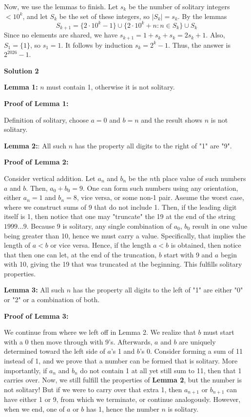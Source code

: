 \begin{enumerate}
 
Now, we use the lemmas to finish. Let $s_k$ be the number of solitary integers $< 10^k$, and let $S_k$ be the set of these integers, so $|S_k|=s_k$. By the lemmas 
 \[S_{k+1} = \{2\cdot 10^k-1\} \cup \{2\cdot 10^k+n : n\in S_k \}\cup S_k\] Since no elements are shared, we have $s_{k+1} = 1 + s_k+s_k=2s_k+1$. Also, $S_1 = \{1\}$, so $s_1 = 1$. It follows by induction $s_k = 2^k-1$. Thus, the answer is $\boxed{2^{2026}-1}$.

 



\textbf{Solution 2}

\textbf{Lemma 1:} $n$ must contain 1, otherwise it is not solitary.

 \textbf{Proof of Lemma 1:}

 Definition of solitary, choose $a = 0$ and $b = n$ and the result shows $n$ is not solitary.

 \textbf{Lemma 2:}: All such $n$ has the property all digits to the right of "1" are "9".

 \textbf{Proof of Lemma 2:}

 Consider vertical addition. Let $a_n$ and $b_n$ be the $n$th place value of such numbers $a$ and $b$. Then, $a_0 + b_0 = 9$. One can form such numbers using any orientation, either $a_n = 1$ and $b_n = 8$, vice versa, or some non-1 pair. Assume the worst case, where we construct sums of 9 that do not include 1. Then, if the leading digit itself is 1, then notice that one may "truncate" the 19 at the end of the string $1999\dots 9$. Because 9 is solitary, any single combination of $a_0$, $b_0$ result in one value being greater than 10, hence we must carry a value. Specifically, that implies the length of $a < b$ or vice versa. Hence, if the length $a < b$ is obtained, then notice that then one can let, at the end of the truncation, $b$ start with 9 and $a$ begin with 10, giving the 19 that was truncated at the beginning. This fulfills solitary properties.

 \textbf{Lemma 3:} All such $n$ has the property all digits to the left of "1" are either "0" or "2" or a combination of both.

 \textbf{Proof of Lemma 3:}

 We continue from where we left off in Lemma 2. We realize that $b$ must start with a 0 then move through with 9's. Afterwards, $a$ and $b$ are uniquely determined toward the left side of $a$'s 1 and $b$'s 0. Consider forming a sum of 11 instead of 1, and we prove that a number can be formed that is solitary. More importantly, if $a_n$ and $b_n$ do not contain 1 at all yet still sum to 11, then that 1 carries over. Now, we still fulfill the properties of \textbf{Lemma 2}, but the number is not solitary! But if we were to carry over that extra 1, then $a_{n+1}$ or $b_{n+1}$ can have either 1 or 9, from which we terminate, or continue analogously. However, when we end, one of $a$ or $b$ has 1, hence the number $n$ is solitary.


\end{enumerate}
